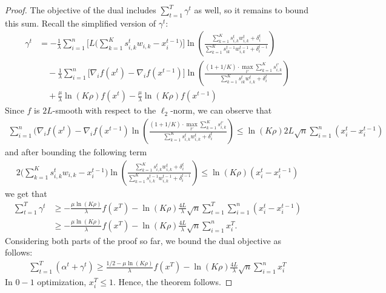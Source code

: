 \begin{proof}
\noindent The objective of the dual includes $\sum_{t = 1}^{T} \gamma^{t}$ as well, so it remains to bound this sum. Recall the simplified version of $\gamma^t$:
\begin{align*}
    \gamma^{t} &= -  \frac{1}{\lambda} \sum_{i=1}^{n} \biggl[ L\biggl( \sum_{k=1}^{K} s_{i,k}^{t} w_{i,k}  - x_{i}^{t-1} \biggr) \biggr]  \ln \left( \frac{\sum_{k=1}^{K} s_{i,k}^{t} w_{i,k}^{t} + \delta_{i}^{t}}{\sum_{k=1}^{K}  s_{ik}^{t-1}w_{i,k}^{t-1}  + \delta_{i}^{t-1}} \right) \\
    	& \quad - \frac{1}{\lambda} \sum_{i=1}^{n} \biggl[ \nabla_{i} f(x^{t}) - \nabla_{i} f(x^{t-1}) \biggr] \ln \left( \frac{(1 + 1/K) \cdot \max_{t'} \sum_{k=1}^{K} s_{i,k}^{t'}}{\sum_{k=1}^{K}  s_{ik}^{t}w_{i,k}^{t}  + \delta_{i}^{t}} \right)  \\
	& \quad + \frac{\mu}{\lambda} \ln(K\rho) f(x^{t}) - \frac{\mu}{\lambda} \ln(K\rho) f(x^{t-1})
\end{align*}
%
Since $f$ is $2L$-smooth with respect to the $\ell_{2}$-norm, we can observe that
\begin{align*}
\sum_{i=1}^{n} (\nabla_{i} f(x^{t}) -  \nabla_{i} f(x^{t-1}) \ln \left( \frac{(1 + 1/K) \cdot \max_{t'} \sum_{k=1}^{K} s_{i,k}^{t'}}{\sum_{k=1}^{K}  s_{i,k}^{t}w_{i,k}^{t}  + \delta_{i}^{t}} \right)
\leq \ln(K\rho) 2L\sqrt{n} \sum_{i=1}^{n} (x_{i}^{t} - x_{i}^{t-1})
\end{align*}
%
and after bounding the following term
%
\begin{align*}
2\biggl( \sum_{k=1}^{K} s_{i,k}^{t} w_{i,k}  - x_{i}^{t-1} \biggr) \ln \left( \frac{\sum_{k=1}^{K} s_{i,k}^{t} w_{i,k}^{t} + \delta_{i}^{t}}{\sum_{k=1}^{K}  s_{i,k}^{t-1}w_{i,k}^{t-1}  + \delta_{i}^{t-1}} \right)
\leq \ln(K\rho) (x_{i}^{t} - x_{i}^{t-1})
\end{align*}
%
we get that
\begin{align*}
\sum_{t=1}^{T} \gamma^{t} &\geq - \frac{\mu \ln (K\rho)}{\lambda} f(x^{T}) - \ln(K\rho) \frac{4L}{\lambda} \sqrt{n} \sum_{t=1}^{T} \sum_{i=1}^{n} (x_{i}^{t} - x_{i}^{t-1}) \\
&\geq - \frac{\mu \ln (K\rho)}{\lambda} f(x^{T}) - \ln(K\rho) \frac{4L}{\lambda} \sqrt{n} \sum_{i=1}^{n} x_{i}^{T}.
\end{align*}
Considering both parts of the proof so far, we bound the dual objective as follows:
\begin{align*}
\sum_{t=1}^{T} (\alpha^{t} + \gamma^{t}) \geq \frac{1/2-\mu\ln (K\rho)}{\lambda} f(x^{T}) - \ln(K\rho) \frac{4L}{\lambda} \sqrt{n} \sum_{i=1}^{n} x_{i}^{T}
\end{align*}
In $0-1$ optimization, $x_{i}^{T} \leq 1$.
Hence, the theorem follows.
\end{proof}
